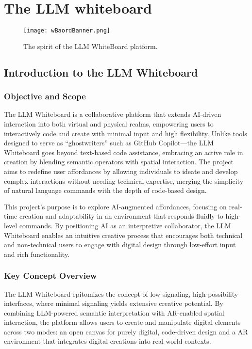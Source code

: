 \section{The LLM whiteboard}

\begin{figure}[!h]
    \centering
    \texttt{[image: wBaordBanner.png]}
    \caption{The spirit of the LLM WhiteBoard platform.}
    \vspace{0.1cm}
    \label{fig:spiritofWB}
\end{figure}

\subsection{ Introduction to the LLM Whiteboard}

\subsubsection{Objective and Scope}

The LLM Whiteboard is a collaborative platform that extends AI-driven interaction into both virtual and physical realms, empowering users to interactively code and create with minimal input and high flexibility.
Unlike tools designed to serve as “ghostwriters” such as GitHub Copilot\cite{chen2021evaluating}\cite{dakhel2023github}—the LLM Whiteboard goes beyond text-based code assistance, embracing an active role in creation by blending semantic operators with spatial interaction.
The project aims to redefine user affordances by allowing individuals to ideate and develop complex interactions without needing technical expertise, merging the simplicity of natural language commands with the depth of code-based design.

This project’s purpose is to explore AI-augmented affordances, focusing on real-time creation and adaptability in an environment that responds fluidly to high-level commands.
By positioning AI as an interpretive collaborator, the LLM Whiteboard enables an intuitive creative process that encourages both technical and non-technical users to engage with digital design through low-effort input and rich functionality.

\subsubsection{Key Concept Overview}

The LLM Whiteboard epitomizes the concept of low-signaling, high-possibility interfaces, where minimal signaling yields extensive creative potential.
By combining LLM-powered semantic interpretation with AR-enabled spatial interaction, the platform allows users to create and manipulate digital elements across two modes: an open canvas for purely digital, code-driven design and a AR environment that integrates digital creations into real-world contexts.

